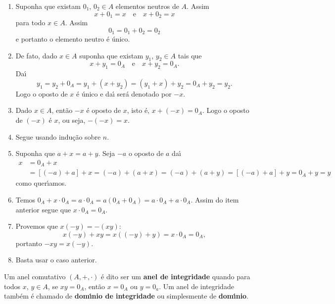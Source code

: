 \begin{prova}
	\begin{enumerate}[label={\roman*})]
		\item Suponha que existam $0_1$, $0_2\in A$ elementos neutros de $A$. Assim
		\[
			x + 0_1 = x \quad \mbox{e}\quad x + 0_2 = x	
		\]
		para todo $x \in A$. Assim
		\[
			0_1 = 0_1 + 0_2 = 0_2
		\]
		e portanto o elemento neutro \'e \'unico.

		\item De fato, dado $x \in A$ suponha que existam $y_1$, $y_2\in A$ tais que
		\[
			x + y_1 = 0_A \quad \mbox{e}\quad x + y_2 = 0_A.
		\]
		Da{\'\i}
		\[
			y_1 = y_2 + 0_A = y_1 + (x + y_2) = (y_1 + x) + y_2 = 0_A + y_2 =y_2.
		\]
		Logo o oposto de $x$ \'e \'unico  e da{\'\i} ser\'a denotado por $-x$.
		
		\item Dado $x \in A$, ent\~ao $-x$ {\'e} oposto de $x$, isto {\'e}, $x + (-x) = 0_A$. Logo o oposto de $(-x)$ {\'e} $x$, ou seja, $-(-x) = x$.

		\item Segue usando indu\c{c}\~ao sobre $n$.

		\item Suponha que $a + x = a + y$. Seja $-a$ o oposto de $a$ da{\'\i}
		\begin{align*}
			x &= 0_A + x \\ &= [(-a) + a] + x = (-a) + (a + x) = (-a) + (a + y) = [(-a) + a] + y = 0_A + y = y
		\end{align*}
		como quer{\'\i}amos.

		\item Temos $0_A + x\cdot 0_A = a\cdot 0_A = a(0_A + 0_A) = a\cdot 0_A + a\cdot 0_A$. Assim do item anterior segue que $x\cdot 0_A = 0_A$.

		\item Provemos que $x(-y) = -(xy)$:
		\[
			x(-y) + xy = x((-y) + y) = x\cdot 0_A = 0_A,
		\]
		portanto $-xy = x(-y)$.

		\item Basta usar o caso anterior.
	\end{enumerate}
\end{prova}

\begin{definicao}
	Um anel comutativo $(A, + , \cdot)$ {\'e} dito ser um \textbf{anel de integridade} quando para todos 
	$x$, $y \in A$, se $xy = 0_A$, ent{\~a}o $x = 0_A$ ou $y = 0_a$. Um anel de integridade tamb{\'e}m {\'e} chamado de \textbf{dom{\'\i}nio de integridade} ou simplesmente de \textbf{dom{\'\i}nio}.
\end{definicao}


